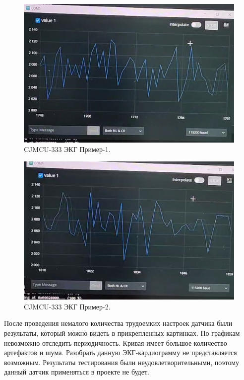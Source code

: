 \documentclass[12pt, russian]{extarticle}
\begin{document}
\begin{spacing}{1.5}
\begin{figure}[htbp]
\centering
\includegraphics[scale=0.6]{resources/cjmcu333/1.png}
\caption{CJMCU-333 ЭКГ Пример-1.}
\label{fig:my_label}
\end{figure}

\begin{figure}[htbp]
\centering
\includegraphics[scale=0.6]{resources/cjmcu333/2.png}
\caption{CJMCU-333 ЭКГ Пример-2.}
\label{fig:my_label}
\end{figure}

\newpage

После проведения немалого количества трудоемких настроек датчика были результаты, который можно видеть в прикрепленных картинках.
По графикам невозможно отследить периодичность. Кривая имеет большое количество артефактов и шума. Разобрать данную ЭКГ-кардиограмму не представляется возможным. Результаты тестирования были неудовлетворительными, поэтому данный датчик применяться в проекте не будет.


\end{spacing}
\end{document}
